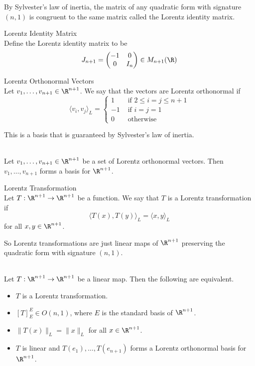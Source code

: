 \documentclass[a4paper]{article}
\begin{document}
By Sylvester's law of inertia, the matrix of any quadratic form with signature $(n,1)$ is congruent to the same matrix called the Lorentz identity matrix. 

\begin{defn}{Lorentz Identity Matrix}{}\\
Define the Lorentz identity matrix to be $$J_{n+1}=\begin{pmatrix}
-1 & 0\\
0 & I_n
\end{pmatrix}\in M_{n+1}(\R)$$
\end{defn}

\begin{defn}{Lorentz Orthonormal Vectors}{}\\
Let $v_1,\dots,v_{n+1}\in\R^{n+1}$. We say that the vectors are Lorentz orthonormal if $$\langle v_i,v_j\rangle_L=\begin{cases}
1 & \text{ if }2\leq i=j\leq n+1\\
-1 & \text{ if }i=j=1\\
0 & \text{ otherwise }
\end{cases}$$
\end{defn}

This is a basis that is guaranteed by Sylvester's law of inertia. 

\begin{lmm}{}{}\\
Let $v_1,\dots,v_{n+1}\in\R^{n+1}$ be a set of Lorentz orthonormal vectors. Then $v_1,\dots,v_{n+1}$ forms a basis for $\R^{n+1}$. 
\end{lmm}

\begin{defn}{Lorentz Transformation}{}\\
Let $T:\R^{n+1}\to\R^{n+1}$ be a function. We say that $T$ is a Lorentz transformation if $$\langle T(x),T(y)\rangle_L=\langle x,y\rangle_L$$ for all $x,y\in\R^{n+1}$. 
\end{defn}

So Lorentz transformations are just linear maps of $\R^{n+1}$ preserving the quadratic form with signature $(n,1)$. 

\begin{prp}{}{}\\
Let $T:\R^{n+1}\to\R^{n+1}$ be a linear map. Then the following are equivalent. 
\begin{itemize}
\item $T$ is a Lorentz transformation. 
\item $[T]_E^E\in O(n,1)$, where $E$ is the standard basis of $\R^{n+1}$. 
\item $\|T(x)\|_L=\|x\|_L$ for all $x\in\R^{n+1}$. 
\item $T$ is linear and $T(e_1),\dots,T(e_{n+1})$ forms a Lorentz orthonormal basis for $\R^{n+1}$. 
\end{itemize}
\end{prp}
\end{document}
